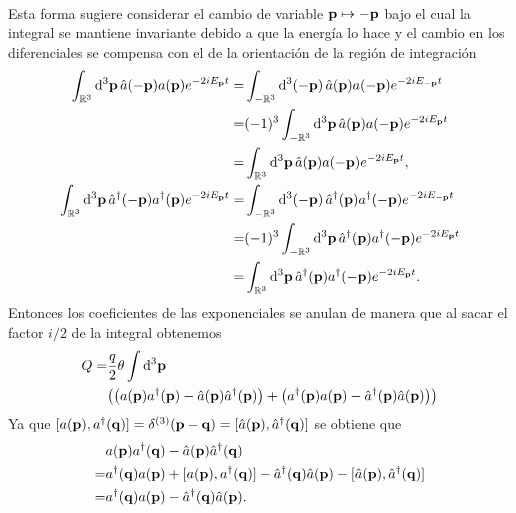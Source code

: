 \documentclass{article}
\begin{document}
\begin{enumerate}[(a)]
\begin{align}
\begin{split}
\end{split}
\end{align}
Esta forma sugiere considerar el cambio de variable $\vb{p}\mapsto -\vb{p}$ bajo el cual la integral se mantiene invariante debido a que la energía lo hace y el cambio en los diferenciales se compensa con el de la orientación de la región de integración
\begin{align}
\begin{split}
\int_{\mathbb{R}^3}\dd[3]{\vb{p}}\hat{a}(-\vb{p})a(\vb{p})e^{-2iE_{\vb{p}}t}=&\int_{-\mathbb{R}^3}\dd[3](-\vb{p})\hat{a}(\vb{p})a(-\vb{p})e^{-2iE_{-\vb{p}}t}\\
=&(-1)^3\int_{-\mathbb{R}^3}\dd[3]{\vb{p}}\hat{a}(\vb{p})a(-\vb{p})e^{-2iE_{\vb{p}}t}\\
=&\int_{\mathbb{R}^3}\dd[3]{\vb{p}}\hat{a}(\vb{p})a(-\vb{p})e^{-2iE_{\vb{p}}t},\\
\int_{\mathbb{R}^3}\dd[3]{\vb{p}}\hat{a}^\dagger(-\vb{p})a^\dagger(\vb{p})e^{-2iE_{\vb{p}}t}=&\int_{-\mathbb{R}^3}\dd[3](-\vb{p})\hat{a}^\dagger(\vb{p})a^\dagger(-\vb{p})e^{-2iE_{-\vb{p}}t}\\
=&(-1)^3\int_{-\mathbb{R}^3}\dd[3]{\vb{p}}\hat{a}^\dagger(\vb{p})a^\dagger(-\vb{p})e^{-2iE_{\vb{p}}t}\\
=&\int_{\mathbb{R}^3}\dd[3]{\vb{p}}\hat{a}^\dagger(\vb{p})a^\dagger(-\vb{p})e^{-2iE_{\vb{p}}t}.
\end{split}
\end{align}
Entonces los coeficientes de las exponenciales se anulan de manera que al sacar el factor $i/2$ de la integral obtenemos
\begin{align}
\begin{split}
Q=&\frac{q}{2}\theta\int\dd[3]{\vb{p}}\\
&\qty(\qty(a(\vb{p})a^\dagger(\vb{p})-\hat{a}(\vb{p})\hat{a}^\dagger(\vb{p}))+\qty(a^\dagger(\vb{p})a(\vb{p})-\hat{a}^\dagger(\vb{p})\hat{a}(\vb{p})))
\end{split}
\end{align}
Ya que $[a(\vb{p}),a^\dagger(\vb{q})]=\delta^{(3)}(\vb{p}-\vb{q})=[\hat{a}(\vb{p}),\hat{a}^\dagger(\vb{q})]$ se obtiene que
\begin{align}
\begin{split}
&a(\vb{p})a^\dagger(\vb{q})-\hat{a}(\vb{p})\hat{a}^\dagger(\vb{q})\\
=&a^\dagger(\vb{q})a(\vb{p})+[a(\vb{p}),a^\dagger(\vb{q})]-\hat{a}^\dagger(\vb{q})\hat{a}(\vb{p})-[\hat{a}(\vb{p}),\hat{a}^\dagger(\vb{q})]\\
=&a^\dagger(\vb{q})a(\vb{p})-\hat{a}^\dagger(\vb{q})\hat{a}(\vb{p}).

\end{split}
\end{align}
\end{enumerate}
\end{document}
